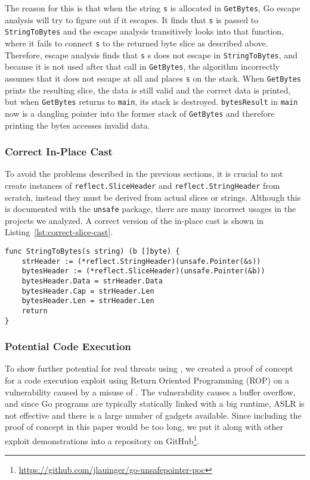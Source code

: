 The reason for this is that when the string \texttt{s} is allocated in \texttt{GetBytes}, Go escape analysis will try to figure out if it escapes.
It finds that \texttt{s} is passed to \texttt{StringToBytes} and the escape analysis transitively looks into that function, where it fails to connect \texttt{s} to the returned byte slice as described above.
Therefore, escape analysis finds that \texttt{s} s does not escape in \texttt{StringToBytes}, and because it is not used after that call in \texttt{GetBytes}, the algorithm incorrectly assumes that it does not escape at all and places \texttt{s} on the stack.
When \texttt{GetBytes} prints the resulting slice, the data is still valid and the correct data is printed, but when \texttt{GetBytes} returns to \texttt{main}, its stack is destroyed.
\texttt{bytesResult} in \texttt{main} now is a dangling pointer into the former stack of \texttt{GetBytes} and therefore printing the bytes accesses invalid data.


\subsubsection*{Correct In-Place Cast}

To avoid the problems described in the previous sections, it is crucial to not create instances of \texttt{reflect.SliceHeader} and \texttt{reflect.StringHeader} from scratch, instead they must be derived from actual slices or strings.
Although this is documented with the \texttt{unsafe} package, there are many incorrect usages in the projects we analyzed.
A correct version of the in-place cast is shown in Listing~\ref{lst:correct-slice-cast}.

\begin{lstlisting}[language=Golang, label=lst:correct-slice-cast, caption=Correct In-Place String to Bytes Cast]
func StringToBytes(s string) (b []byte) {
	strHeader := (*reflect.StringHeader)(unsafe.Pointer(&s))
	bytesHeader := (*reflect.SliceHeader)(unsafe.Pointer(&b))
	bytesHeader.Data = strHeader.Data
	bytesHeader.Cap = strHeader.Len
    bytesHeader.Len = strHeader.Len
	return
}
\end{lstlisting}


\subsubsection*{Potential Code Execution}

To show further potential for real threats using \unsafe{}, we created a proof of concept for a code execution exploit using Return Oriented Programming (ROP) on a vulnerability caused by a misuse of \unsafe{}.
The vulnerability causes a buffer overflow, and since Go programs are typically statically linked with a big runtime, ASLR is not effective and there is a large number of gadgets available.
Since including the proof of concept in this paper would be too long, we put it along with other exploit demonstrations into a repository on GitHub\footnote{\url{https://github.com/jlauinger/go-unsafepointer-poc}}. 


